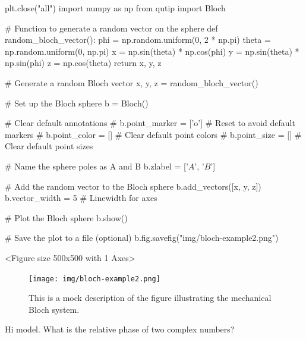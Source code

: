   \begin{python}
  plt.close("all")
  import numpy as np
  from qutip import Bloch

  # Function to generate a random vector on the sphere
  def random_bloch_vector():
      phi = np.random.uniform(0, 2 * np.pi)
      theta = np.random.uniform(0, np.pi)
      x = np.sin(theta) * np.cos(phi)
      y = np.sin(theta) * np.sin(phi)
      z = np.cos(theta)
      return x, y, z

  # Generate a random Bloch vector
  x, y, z = random_bloch_vector()

  # Set up the Bloch sphere
  b = Bloch()

  # Clear default annotations
  # b.point_marker = ['o']  # Reset to avoid default markers
  # b.point_color = []      # Clear default point colors
  # b.point_size = []       # Clear default point sizes

  # Name the sphere poles as A and B
  b.zlabel = ['$A$', '$B$']

  # Add the random vector to the Bloch sphere
  b.add_vectors([x, y, z])
  b.vector_width = 5  # Linewidth for axes

  # Plot the Bloch sphere
  b.show()

  # Save the plot to a file (optional)
  b.fig.savefig("img/bloch-example2.png")
  \end{python}



  \begin{result}
  <Figure size 500x500 with 1 Axes>
  \end{result}

\begin{figure}[h!]
  \centering
  \texttt{[image: img/bloch-example2.png]}
  \caption{This is a mock description of the figure illustrating the mechanical Bloch system.}
  \label{fig:mechanical_bloch}
\end{figure}


\begin{ai}
Hi model. What is the relative phase of two complex numbers?
\end{ai}


